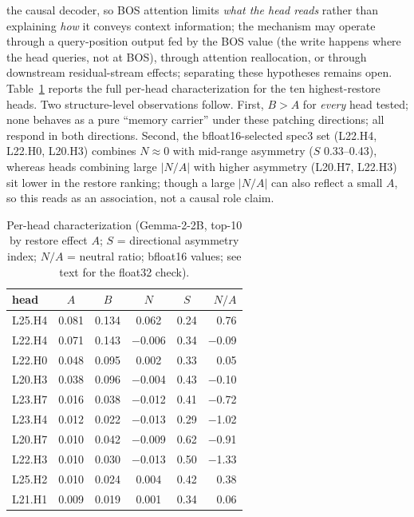 \documentclass[paper]{ieice}
\newcommand{\emodel}{Gemma-2-2B}
\newcommand{\spec}{L22.H4}
\begin{document}
the causal decoder, so BOS attention limits \emph{what the head reads}
rather than explaining \emph{how} it conveys context information; the
mechanism may operate through a query-position output fed by the BOS
value (the write happens where the head queries, not at BOS), through
attention reallocation, or through downstream residual-stream effects;
separating these hypotheses remains open.
Table~\ref{tab:heads} reports the full per-head characterization for the
ten highest-restore heads. Two structure-level observations follow. First,
$B>A$ for \emph{every} head tested; none behaves as a pure ``memory
carrier'' under these patching directions; all respond in both
directions. Second, the bfloat16-selected spec3 set (\spec{}, L22.H0,
L20.H3) combines $N\approx 0$ with
mid-range asymmetry ($S$ 0.33--0.43), whereas heads combining large
$|N/A|$ with higher asymmetry (L20.H7, L22.H3) sit lower in the restore
ranking; though a large $|N/A|$ can also reflect a small $A$, so
this reads as an association, not a causal role claim.

\begin{table}[t]
\caption{Per-head characterization (\emodel{}, top-10 by restore effect
$A$; $S$ = directional asymmetry index; $N/A$ = neutral ratio;
bfloat16 values; see text for the float32 check).}
\label{tab:heads}
\begin{center}
\begin{tabular}{lccccr}
\toprule
head & $A$ & $B$ & $N$ & $S$ & $N/A$ \\
\midrule
L25.H4 & 0.081 & 0.134 & \phantom{$-$}0.062 & 0.24 & \phantom{$-$}0.76 \\
L22.H4 & 0.071 & 0.143 & $-$0.006 & 0.34 & $-$0.09 \\
L22.H0 & 0.048 & 0.095 & \phantom{$-$}0.002 & 0.33 & \phantom{$-$}0.05 \\
L20.H3 & 0.038 & 0.096 & $-$0.004 & 0.43 & $-$0.10 \\
L23.H7 & 0.016 & 0.038 & $-$0.012 & 0.41 & $-$0.72 \\
L23.H4 & 0.012 & 0.022 & $-$0.013 & 0.29 & $-$1.02 \\
L20.H7 & 0.010 & 0.042 & $-$0.009 & 0.62 & $-$0.91 \\
L22.H3 & 0.010 & 0.030 & $-$0.013 & 0.50 & $-$1.33 \\
L25.H2 & 0.010 & 0.024 & \phantom{$-$}0.004 & 0.42 & \phantom{$-$}0.38 \\
L21.H1 & 0.009 & 0.019 & \phantom{$-$}0.001 & 0.34 & \phantom{$-$}0.06 \\
\bottomrule
\end{tabular}
\end{center}
\end{table}
\end{document}

